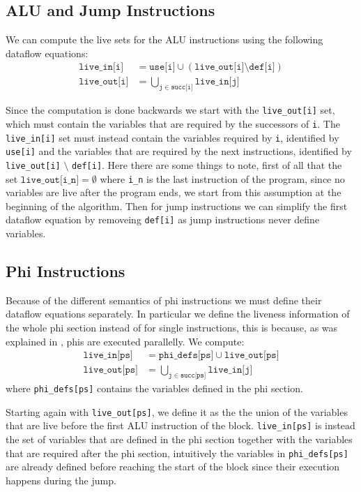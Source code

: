 \subsection{ALU and Jump Instructions}

We can compute the live sets for the ALU instructions using the following dataflow equations:
\begin{align*}
  \texttt{live\_in[i]} &= \texttt{use[i]} \cup (\texttt{live\_out[i]} \setminus \texttt{def[i]}) \\
  \texttt{live\_out[i]} &= \bigcup \limits_{\texttt j \in \texttt{succ[i]}} \texttt{live\_in[j]}
\end{align*}

Since the computation is done backwards we start with the \texttt{live\_out[i]} set, which must contain the variables that are required by the successors of \texttt i. The
\texttt{live\_in[i]} set must instead contain the variables required by \texttt i, identified by \texttt{use[i]} and the variables that are required by the next instructions, identified by \texttt{live\_out[i]} $\setminus$ \texttt{def[i]}.
Here there are some things to note, first of all that the set $\texttt{live\_out[i\_n]} = \emptyset$ where \texttt{i\_n} is the last instruction of the program, since no variables are live after the program ends, we start from this assumption at the beginning of the algorithm.
Then for jump instructions we can simplify the first dataflow equation by removeing \texttt{def[i]} as jump instructions never define variables.

\subsection{Phi Instructions}

Because of the different semantics of phi instructions we must define their dataflow equations separately. In particular we define the liveness information of the whole phi section instead of for single instructions, this is because, as was explained in , phis are executed parallelly.
We compute:
\begin{align*}
  \texttt{live\_in[ps]} &= \texttt{phi\_defs[ps]} \cup \texttt{live\_out[ps]} \\
  \texttt{live\_out[ps]} &= \bigcup \limits_{\texttt j \in \texttt{succ[ps]}} \texttt{live\_in[j]}
\end{align*}
where \texttt{phi\_defs[ps]} contains the variables defined in the phi section.

Starting again with \texttt{live\_out[ps]}, we define it as the the union of the variables that are live before the first ALU instruction of the block. \texttt{live\_in[ps]} is instead the set of variables that are defined in the phi section together with the variables that are required after the phi section, intuitively the variables in \texttt{phi\_defs[ps]} are already defined before reaching the start of the block since their execution happens during the jump.

